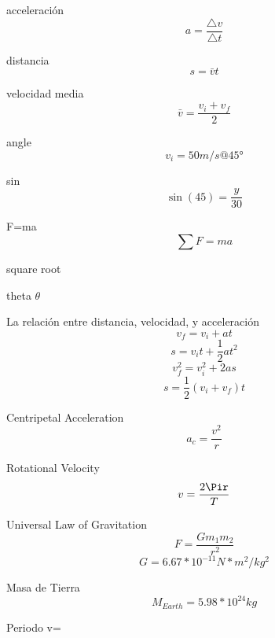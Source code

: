 
acceleración
\[ a=\frac{\triangle{v}}{\triangle{t}} \]

distancia
\[ s=\bar{v}t \]

velocidad media
\[ \bar{v} = \frac{v_i+v_f}{2} \]

angle
\[ v_i=50m/s @ \ang{45} \]

sin
\[ \sin(45)=\frac{y}{30} \]

F=ma
\[ \sum F=ma \]

square root
\sqrt{}

theta
$\theta$

La relación entre distancia, velocidad, y acceleración
\[ v_f=v_i+at \]
\[ s=v_it+\frac{1}{2}at^2 \]
\[ v_f^2=v_i^2+2as \]
\[ s=\frac{1}{2}(v_i+v_f)t \]

Centripetal Acceleration
\[ a_c=\frac{v^2}{r} \]

Rotational Velocity
\[ v=\frac{2\Pir}{T} \]

Universal Law of Gravitation
\[ F=\frac{Gm_1m_2}{r^2} \]
\[ G=6.67*10^{-11}N*m^2/kg^2 \]

Masa de Tierra
\[ M_{Earth}=5.98*10^24kg \]

Periodo
v=
